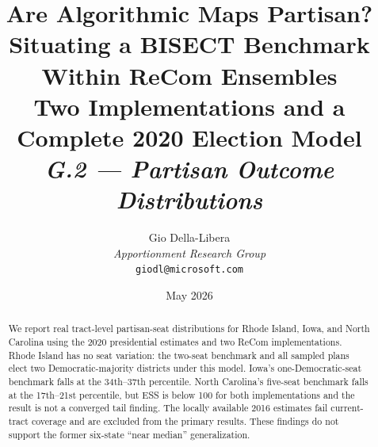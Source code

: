 \documentclass[12pt]{article}
\title{%
  \textbf{Are Algorithmic Maps Partisan?}\\
  \textbf{Situating a BISECT Benchmark Within ReCom Ensembles}\\[0.4em]
  \large Two Implementations and a Complete 2020 Election Model\\[0.8em]
  \normalsize\textit{G.2 --- Partisan Outcome Distributions}%
}
\author{%
  Gio Della-Libera\\
  \textit{Apportionment Research Group}\\
  \small\texttt{giodl@microsoft.com}
}
\date{May 2026}
\begin{document}
\maketitle

\begin{abstract}
\noindent
We report real tract-level partisan-seat distributions for Rhode Island, Iowa,
and North Carolina using the 2020 presidential estimates and two ReCom
implementations. Rhode Island has no seat variation: the two-seat benchmark and
all sampled plans elect two Democratic-majority districts under this model.
Iowa's one-Democratic-seat benchmark falls at the 34th--37th percentile.
North Carolina's five-seat benchmark falls at the 17th--21st percentile, but
ESS is below 100 for both implementations and the result is not a converged
tail finding. The locally available 2016 estimates fail current-tract coverage
and are excluded from the primary results. These findings do not support the
former six-state ``near median'' generalization.
\end{abstract}

\tableofcontents
\newpage





\end{document}
